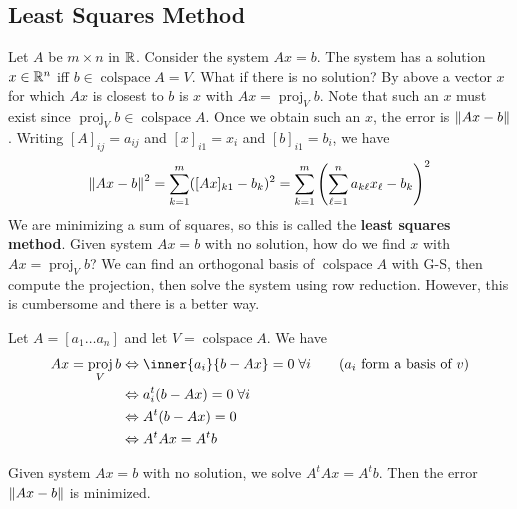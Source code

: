 \documentclass{article}
\DeclareMathOperator{\colspace}{colspace}
\DeclareMathOperator{\proj}{proj}
\begin{document}
    \subsection{Least Squares Method}
    \begin{remark}
      Let $A$ be $m \times n$ in $\mathbb{R}$. Consider the system $Ax = b$. The system has a solution $x \in \mathbb{R}^n$ iff $b \in \colspace A = V$. What if there is no solution? By above a vector $x$ for which $Ax$ is closest to $b$ is $x$ with $Ax = \proj_Vb$. Note that such an $x$ must exist since $\proj_Vb \in \colspace A$. Once we obtain such an $x$, the error is $\norm{Ax - b}$. Writing $[A]_{ij} = a_{ij}$ and $[x]_{i1} = x_i$ and $[b]_{i1} = b_i$, we have \[
        \norm{Ax - b}^2 = \sum_{k=1}^m ([Ax]_{k1} - b_k)^2  = \sum_{k=1}^m \left(\sum_{\ell = 1}^n a_{k\ell}x_\ell - b_k\right)^2
      \]
      We are minimizing a sum of squares, so this is called the \textbf{least squares method}. Given system $Ax = b$ with no solution, how do we find $x$ with $Ax = \proj_Vb$? We can find an orthogonal basis of $\colspace A$ with G-S, then compute the projection, then solve the system using row reduction. However, this is cumbersome and there is a better way.

      Let $A = [a_1 \dots a_n]$ and let $V = \colspace A$. We have
      \begin{align*}
        Ax = \proj_Vb &\iff \inner{a_i}{b-Ax} = 0 \; \forall i \tag{$a_i$ form a basis of $v$}\\
        &\iff a_i^t(b-Ax) = 0 \; \forall i\\
        &\iff A^t(b-Ax) = 0\\
        &\iff A^tAx = A^tb\\
      \end{align*}
    \end{remark}
    \begin{theorem}
      Given system $Ax = b$ with no solution, we solve $A^tAx = A^tb$. Then the error $\norm{Ax - b}$ is minimized.
    \end{theorem}
\end{document}

